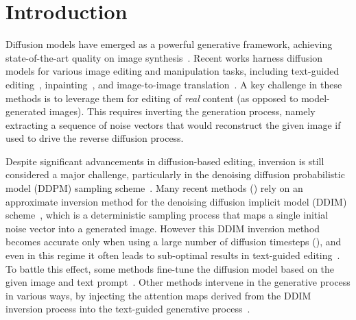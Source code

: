 \section{Introduction}
\label{intro}

Diffusion models have emerged as a powerful generative framework, achieving state-of-the-art quality on image synthesis~\cite{Ho20,balaji22,Rombach22,pmlr22,saharia22,Ramesh22}. Recent works harness diffusion models for various image editing and manipulation tasks, including text-guided editing~\cite{Hertz22,Guillaume22,Narek22,avrahami22,Kim22}, inpainting~\cite{Lugmayr22}, and image-to-image translation~\cite{Saharia21,Meng22,Wu22}. A key challenge in these methods is to leverage them for editing of \emph{real} content (as opposed to model-generated images). %
This requires inverting the generation process, namely extracting a sequence of noise vectors that would reconstruct the given image if used to drive the reverse diffusion process.

Despite significant advancements in diffusion-based editing, inversion is still considered a major challenge, particularly in the denoising diffusion probabilistic model (DDPM) sampling scheme~\cite{Ho20}. Many recent methods (\eg \cite{Hertz22,Mokady22,Narek22,Guillaume22,Bram22,Parmar23}) rely on an approximate inversion method for the denoising diffusion implicit model (DDIM) scheme~\cite{Song21}, which is a deterministic sampling process that maps a single initial noise vector into a generated image. However this DDIM inversion method becomes accurate only when using a large number of diffusion timesteps (), and even in this regime it often leads to sub-optimal results in text-guided editing~\cite{Hertz22,Mokady22}. To battle this effect, some methods fine-tune the diffusion model based on the given image and text prompt~\cite{Bahjat22,Kim22,Valevski22,zhang23}. Other methods intervene in the generative process in various ways, \eg by injecting the attention maps derived from the DDIM inversion process into the text-guided generative process~\cite{Hertz22,Parmar23,Narek22,cao23}.


